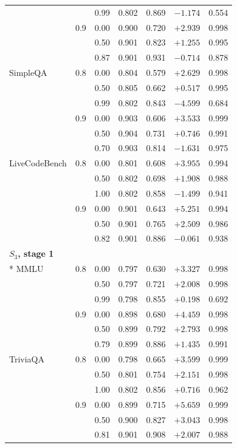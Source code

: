 \begin{longtable}{llrrrrr}
 &  & 0.99 & 0.802 & 0.869 & $-1.174$ & 0.554 \\
 & 0.9 & 0.00 & 0.900 & 0.720 & $+2.939$ & 0.998 \\
 &  & 0.50 & 0.901 & 0.823 & $+1.255$ & 0.995 \\
 &  & 0.87 & 0.901 & 0.931 & $-0.714$ & 0.878 \\
SimpleQA & 0.8 & 0.00 & 0.804 & 0.579 & $+2.629$ & 0.998 \\
 &  & 0.50 & 0.805 & 0.662 & $+0.517$ & 0.995 \\
 &  & 0.99 & 0.802 & 0.843 & $-4.599$ & 0.684 \\
 & 0.9 & 0.00 & 0.903 & 0.606 & $+3.533$ & 0.999 \\
 &  & 0.50 & 0.904 & 0.731 & $+0.746$ & 0.991 \\
 &  & 0.70 & 0.903 & 0.814 & $-1.631$ & 0.975 \\
LiveCodeBench & 0.8 & 0.00 & 0.801 & 0.608 & $+3.955$ & 0.994 \\
 &  & 0.50 & 0.802 & 0.698 & $+1.908$ & 0.988 \\
 &  & 1.00 & 0.802 & 0.858 & $-1.499$ & 0.941 \\
 & 0.9 & 0.00 & 0.901 & 0.643 & $+5.251$ & 0.994 \\
 &  & 0.50 & 0.901 & 0.765 & $+2.509$ & 0.986 \\
 &  & 0.82 & 0.901 & 0.886 & $-0.061$ & 0.938 \\
\multicolumn{7}{l}{\textbf{$S_3$, stage 1}} \\*
\midrule
MMLU & 0.8 & 0.00 & 0.797 & 0.630 & $+3.327$ & 0.998 \\
 &  & 0.50 & 0.797 & 0.721 & $+2.008$ & 0.998 \\
 &  & 0.99 & 0.798 & 0.855 & $+0.198$ & 0.692 \\
 & 0.9 & 0.00 & 0.898 & 0.680 & $+4.459$ & 0.998 \\
 &  & 0.50 & 0.899 & 0.792 & $+2.793$ & 0.998 \\
 &  & 0.79 & 0.899 & 0.886 & $+1.435$ & 0.991 \\
TriviaQA & 0.8 & 0.00 & 0.798 & 0.665 & $+3.599$ & 0.999 \\
 &  & 0.50 & 0.801 & 0.754 & $+2.151$ & 0.998 \\
 &  & 1.00 & 0.802 & 0.856 & $+0.716$ & 0.962 \\
 & 0.9 & 0.00 & 0.899 & 0.715 & $+5.659$ & 0.999 \\
 &  & 0.50 & 0.900 & 0.827 & $+3.043$ & 0.998 \\
 &  & 0.81 & 0.901 & 0.908 & $+2.007$ & 0.988 \\

\end{longtable}

